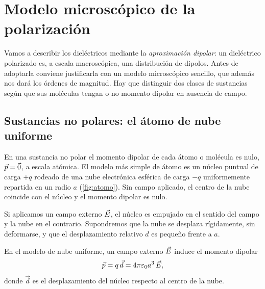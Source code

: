 \section{Modelo microscópico de la polarización}\label{sec:microscopico}

Vamos a describir los dieléctricos mediante la \emph{aproximación dipolar}: un dieléctrico polarizado es,
a escala macroscópica, una distribución de dipolos. Antes de adoptarla conviene justificarla con un
modelo microscópico sencillo, que además nos dará los órdenes de magnitud. Hay que distinguir dos clases
de sustancias según que sus moléculas tengan o no momento dipolar en ausencia de campo.

\subsection{Sustancias no polares: el átomo de nube uniforme}\label{sec:no-polares}

En una sustancia no polar el momento dipolar de cada átomo o molécula es nulo, $\vec p=\vec 0$, a escala
atómica. El modelo más simple de átomo es un núcleo puntual de carga $+q$ rodeado de una nube electrónica
esférica de carga $-q$ uniformemente repartida en un radio $a$ (\cref{fig:atomo}). Sin campo aplicado,
el centro de la nube coincide con el núcleo y el momento dipolar es nulo.



Si aplicamos un campo externo $\vec E$, el núcleo es empujado en el sentido del campo y la nube en el
contrario. Supondremos que la nube se desplaza rígidamente, sin deformarse, y que el desplazamiento
relativo $d$ es pequeño frente a $a$.

\begin{proposicion}\label{prop:polarizabilidad}
En el modelo de nube uniforme, un campo externo $\vec E$ induce el momento dipolar
\begin{equation}\label{eq:p-atomo}
  \vec p=q\,\vec d=4\pi\varepsilon_0 a^3\,\vec E ,
\end{equation}
donde $\vec d$ es el desplazamiento del núcleo respecto al centro de la nube.
\end{proposicion}

